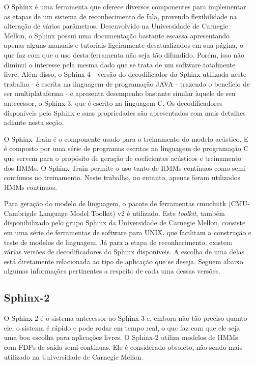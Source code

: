 \documentclass[12pt,a4paper,oneside]{report}
\begin{document}
O Sphinx é uma ferramenta que oferece diversos componentes para implementar as etapas de um sistema de reconhecimento de fala, provendo flexibilidade na alteração de vários parâmetros.
Desenvolvido na Universidade de Carnegie Mellon, o Sphinx possui uma documentação bastante escassa apresentando apenas alguns manuais e tutoriais ligeiramente desatualizados em sua página, o que faz com que o uso desta ferramenta não seja tão difundido. Porém, isso não diminui o interesse pela mesma dado que se trata de um software totalmente livre. Além disso, o Sphinx-4 - versão do decodificador do Sphinx utilizada neste trabalho - é escrita na linguagem de programação JAVA - trazendo o benefício de ser multiplataforma - e apresenta desempenho bastante similar àquele de seu antecessor, o Sphinx-3, que é escrito na linguagem C. Os decodificadores disponíveis pelo Sphinx e suas propriedades são apresentados com mais detalhes adiante nesta seção.

O Sphinx Train é o componente usado para o treinamento do modelo acústico. E é composto por uma série de programas escritos na linguagem de programação C que servem para o propósito de geração de coeficientes acústicos e treinamento dos HMMs. O Sphinx Train permite o uso tanto de HMMs contínuos como semi-contínuos no treinamento. Neste trabalho, no entanto, apenas foram utilizados HMMs contínuos.

Para geração do modelo de linguagem, o pacote de ferramentas cmuclmtk (CMU-Cambrigde Language Model Toolkit) v2 é utilizado. Este \emph{toolkit}, também disponibilizado pelo grupo Sphinx da Universidade de Carnegie Mellon, consiste em uma série de ferramentas de software para UNIX, que facilitam a construção e teste de modelos de linguagem.
Já para a etapa de reconhecimento, existem várias versões de decodificadores do Sphinx disponíveis. A escolha de uma delas está diretamente relacionada ao tipo de aplicação que se deseja. Seguem abaixo algumas informações pertinentes a respeito de cada uma dessas versões.

\subsection{Sphinx-2}

O Sphinx-2 é o sistema antecessor ao Sphinx-3 e, embora não tão preciso quanto ele, o sistema é rápido e pode rodar em tempo real, o que faz com que ele seja uma boa escolha para aplicações livres.
O Sphinx-2 utiliza modelos de HMMs com FDPs de saída semi-contínuas. Ele é considerado obsoleto, não sendo mais utilizado na Universidade de Carnegie Mellon.
\end{document}
